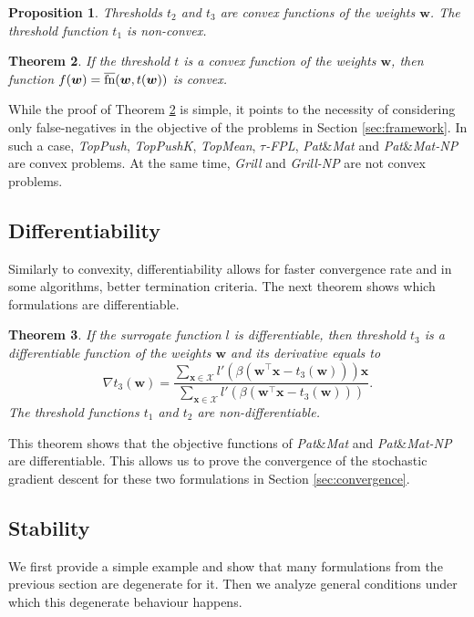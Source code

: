 \documentclass[]{interact}
\theoremstyle{plain}%
\newtheorem{theorem}{Theorem}[section]
\newtheorem{proposition}[theorem]{Proposition}
\theoremstyle{definition}
\theoremstyle{remark}
\newcommand{\toppush}{\emph{TopPush}\xspace}
\newcommand{\toppushk}{\emph{TopPushK}\xspace}
\newcommand{\grill}{\emph{Grill}\xspace}
\newcommand{\patmat}{\emph{Pat}\&\emph{Mat}\xspace}
\newcommand{\topmeank}{\emph{TopMean}\xspace}
\newcommand{\npA}{\emph{Grill-NP}\xspace}
\newcommand{\npB}{{\emph{Pat}\&\emph{Mat-NP}}\xspace}
\newcommand{\npC}{{\emph{$\tau$-FPL}}\xspace}
\newcommand{\fns}{\overline{\textnormal{fn}}}
\newcommand{\Xcal}{\mathcal{X}}
\begin{document}
\begin{proposition}\label{prop:convex}
  Thresholds $t_2$ and $t_3$ are convex functions of the weights $\bm w$. The threshold function $t_1$ is non-convex.
\end{proposition}

\begin{theorem}\label{thm:convex}
  If the threshold $t$ is a convex function of the weights $\bm w$, then function $f(\bm w) = \fns(\bm w, t(\bm w))$ is convex.
\end{theorem}

While the proof of Theorem \ref{thm:convex} is simple, it points to the necessity of considering only false-negatives in the objective of the problems in Section \ref{sec:framework}. In such a case, \toppush, \toppushk, \topmeank, \npC, \patmat and \npB are convex problems. At the same time, \grill and \npA are not convex problems.


\subsection{Differentiability}

Similarly to convexity, differentiability allows for faster convergence rate and in some algorithms, better termination criteria. The next theorem shows which formulations are differentiable.

\begin{theorem}\label{thm:derivative}
  If the surrogate function $l$ is differentiable, then threshold $t_3$ is a differentiable function of the weights $\bm w$ and its derivative equals to
  $$
    \nabla t_3(\bm w) = \frac{\sum_{\bm x\in\Xcal}l'(\beta(\bm w^\top \bm x-t_3(\bm w)))\bm x}{\sum_{\bm x\in\Xcal}l'(\beta(\bm w^\top \bm x-t_3(\bm w)))}.
  $$
  The threshold functions $t_1$ and $t_2$ are non-differentiable.
\end{theorem}

\noindent This theorem shows that the objective functions of \patmat and \npB are differentiable. This allows us to prove the convergence of the stochastic gradient descent for these two formulations in Section \ref{sec:convergence}.


\subsection{Stability}\label{sec:stability}

We first provide a simple example and show that many formulations from the previous section are degenerate for it. Then we analyze general conditions under which this degenerate behaviour happens.
\end{document}
